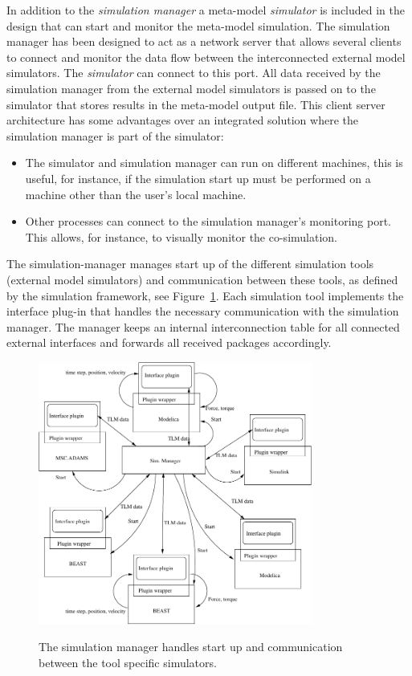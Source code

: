 In addition to the {\em simulation manager} a meta-model {\em
  simulator} is included in the design that can start and monitor the
meta-model simulation.
The simulation manager has been designed to act as a network server
that allows several clients to connect and monitor the data flow
between the interconnected external model simulators. The {\em
  simulator} can connect to this port. All data received by the
simulation manager from the external model simulators is passed on to
the simulator that stores results in the meta-model output file.  This
client server architecture has some advantages over an integrated
solution where the simulation manager is part of the simulator:
\begin{itemize}
\item The simulator and simulation manager can run on different machines,
	this is useful, for instance, if the simulation start up must
	be performed on a machine other than the user's local machine.
\item Other processes can connect to the simulation manager's
	monitoring port. This allows, for instance, to visually
	monitor the co-simulation.
\end{itemize}

The simulation-manager manages start up of the different
simulation tools (external model simulators) and communication between
these tools, as defined by the simulation framework, see
Figure~\ref{fig:MMSystem}. Each simulation tool implements the
interface plug-in that handles the necessary communication with the
simulation manager. The manager keeps an internal interconnection
table for all connected external interfaces and forwards all received
packages accordingly.

\begin{figure}[ht]\begin{center}
%    
   {\includegraphics[width=9cm]{figs/TLM_system.pdf}}
    \caption{The simulation manager handles start up and communication
	between the tool specific simulators.}
    \label{fig:MMSystem}
\end{center}\end{figure}

